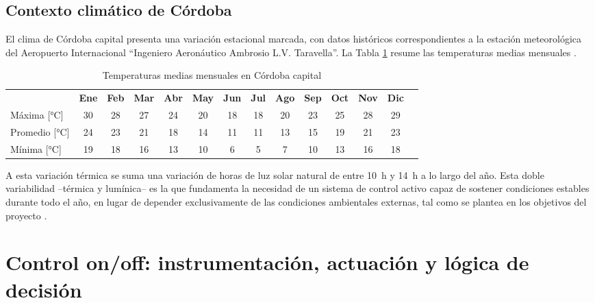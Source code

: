 \section{Contexto climático de Córdoba}
\label{subsec:clima_cordoba}

El clima de Córdoba capital presenta una variación estacional marcada, con datos históricos correspondientes a la estación meteorológica del Aeropuerto Internacional ``Ingeniero Aeronáutico Ambrosio L.V. Taravella''. La Tabla \ref{tab:clima_cordoba} resume las temperaturas medias mensuales \cite{weatherspark_cordoba}.

\begin{table}[H]
\centering
\footnotesize
\begin{tabular}{@{}lccccccccccccc@{}}
& \textbf{Ene} & \textbf{Feb} & \textbf{Mar} & \textbf{Abr} & \textbf{May} & \textbf{Jun} & \textbf{Jul} & \textbf{Ago} & \textbf{Sep} & \textbf{Oct} & \textbf{Nov} & \textbf{Dic} \\
Máxima [\si{\celsius}] & 30 & 28 & 27 & 24 & 20 & 18 & 18 & 20 & 23 & 25 & 28 & 29 \\
Promedio [\si{\celsius}] & 24 & 23 & 21 & 18 & 14 & 11 & 11 & 13 & 15 & 19 & 21 & 23 \\
Mínima [\si{\celsius}] & 19 & 18 & 16 & 13 & 10 & 6 & 5 & 7 & 10 & 13 & 16 & 18 \\
\end{tabular}

\caption{Temperaturas medias mensuales en Córdoba capital}
\label{tab:clima_cordoba}

\end{table}

A esta variación térmica se suma una variación de horas de luz solar natural de entre \SI{10}{\hour} y \SI{14}{\hour} a lo largo del año. Esta doble variabilidad --térmica y lumínica-- es la que fundamenta la necesidad de un sistema de control activo capaz de sostener condiciones estables durante todo el año, en lugar de depender exclusivamente de las condiciones ambientales externas, tal como se plantea en los objetivos del proyecto \cite{weatherspark_cordoba}.

\chapter{Control on/off: instrumentación, actuación y lógica de decisión}
\label{cha:control_onoff}


